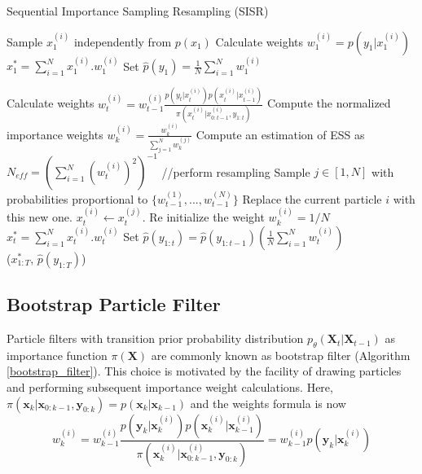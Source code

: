 \documentclass[11pt,a4,twosided,singlespacing,titlepagenumber=on]{scrreprt}
\numberwithin{equation}{chapter} %
\theoremstyle{remark}
\newcommand{\matr}[1]{\mathbf{#1}}
\begin{document}
\begin{algorithm}[H]
\caption{Sequential Importance Sampling Resampling (SISR)}\label{sisr_filter}
\begin{algorithmic}[1]
	\State Sample $x_1^{(i)}$ independently from $p(x_1)$
	\State Calculate weights $w_1^{(i)} = p(y_1 | x_1^{(i)})$
\State $x^*_1 = \sum_{i=1}^N x_1^{(i)}.w_1^{(i)}$
\State Set $\hat{p}(y_1) = \frac{1}{N} \sum_{i=1}^N w_1^{(i)}$

		\State Calculate weights $\displaystyle{w_t^{(i)} = w_{t-1}^{(i)} \frac{p(y_t|x_t^{(i)}) p(x_t^{(i)}|x_{t-1}^{(i)})}{\pi \left(x_t^{(i)}|x_{0:t-1}^{(i)}, y_{1:t} \right)}}$
		\State Compute the normalized importance weights $\displaystyle{w_k^{(i)} = \frac{w_k^{(i)}}{\sum_{j=1}^N w_k^{(j)}}}$
		\State Compute an estimation of ESS as $\displaystyle{N_{eff} = \left( \sum_{i=1}^N \left(w_t^{(i)} \right)^2 \right)^{-1}}$
		 //perform resampling
		    \State Sample $j \in [1,N]$ with probabilities proportional to $\{w_{t-1}^{(1)},..., w_{t-1}^{(N)}\}$
		    \State Replace the current particle $i$ with this new one. $x_t^{(i)} \gets x_t^{(j)}$.
		    \State Re initialize the weight $w_k^{(i)} = 1/N$
		\EndIf
	\State $x^*_t = \sum_{i=1}^N x_t^{(i)}.w_t^{(i)}$
	\State Set $\hat{p}(y_{1:t}) = \hat{p}(y_{1:t-1}) \left(\frac{1}{N} \sum_{i=1}^N w_t^{(i)} \right)$
\\
\Return ($x^*_{1:T}$, $\hat{p}(y_{1:T})$)
\EndProcedure
\end{algorithmic}
\end{algorithm}

\subsection{Bootstrap Particle Filter}

Particle filters with transition prior probability distribution $p_\theta(\matr{X}_t | \matr{X}_{t-1})$ as importance function $\pi(\matr{X})$ are commonly known as bootstrap filter (Algorithm \ref{bootstrap_filter}). This choice is motivated by the facility of drawing particles and performing subsequent importance weight calculations. Here, $\pi(\matr{x}_k| \matr{x}_{0:k-1}, \matr{y}_{0:k}) = p(\matr{x}_k|\matr{x}_{k-1})$ and the weights formula is now
\begin{equation}
w_k^{(i)} = w_{k-1}^{(i)} \frac{p(\matr{y}_k|\matr{x}_k^{(i)})p(\matr{x}_k^{(i)}|\matr{x}^{(i)}_{k-1})}{\pi(\matr{x}_k^{(i)}|\matr{x}^{(i)}_{0:k-1},\matr{y}_{0:k})}= w_{k-1}^{(i)} p(\matr{y}_k|\matr{x}_k^{(i)})
\end{equation}
\end{document}
